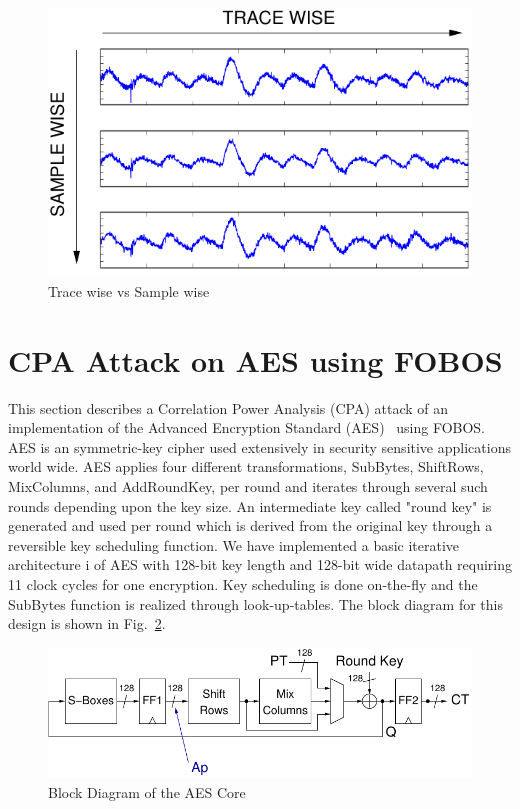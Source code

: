 \documentclass{llncs}
\numberwithin{algorithm}{chapter}
\begin{document}
\begin{figure}[ht]
\begin{center}
\includegraphics[scale=0.6]{figures/sampleVstrace}
\caption{\label{fig:tvs}Trace wise vs Sample wise}
\end{center} 
\vspace{-3ex}
\end{figure}


\section{CPA Attack on AES using FOBOS}

This section describes a Correlation Power Analysis (CPA) attack of an implementation of the
Advanced Encryption Standard (AES)~\cite{146} using FOBOS. 
AES is an symmetric-key cipher used extensively
in security sensitive applications world wide. AES applies four different transformations,
SubBytes, ShiftRows, MixColumns, and AddRoundKey, per round and iterates through several 
such rounds depending upon the key size. An intermediate key called 
"round key" is generated and used per round which is derived from the original key through 
a reversible key scheduling function. We have implemented a basic iterative architecture i
of AES with 128-bit 
key length and 128-bit wide datapath requiring 11 clock cycles for one encryption.
Key scheduling is done on-the-fly and the SubBytes function is realized through look-up-tables.
The block diagram for this design is shown in Fig.~\ref{fig:fobos-aes128}.

\begin{figure}[ht]
\begin{center}
\includegraphics[scale=0.8]{figures/aes128}
\caption{Block Diagram of the AES Core}\label{fig:fobos-aes128}
\end{center} 
\vspace{-3ex}
\end{figure}
\end{document}

